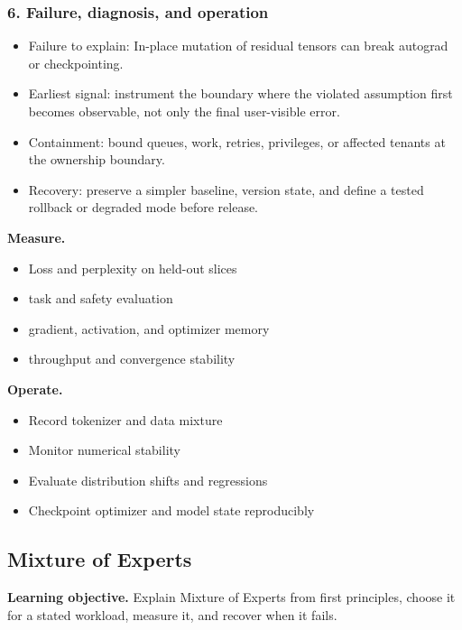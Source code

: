 \subsubsection*{6. Failure, diagnosis, and operation}
\begin{itemize}
\item Failure to explain: In-place mutation of residual tensors can break autograd or checkpointing.
\item Earliest signal: instrument the boundary where the violated assumption first becomes observable, not only the final user-visible error.
\item Containment: bound queues, work, retries, privileges, or affected tenants at the ownership boundary.
\item Recovery: preserve a simpler baseline, version state, and define a tested rollback or degraded mode before release.
\end{itemize}
\textbf{Measure.}\begin{itemize}
\item Loss and perplexity on held-out slices
\item task and safety evaluation
\item gradient, activation, and optimizer memory
\item throughput and convergence stability
\end{itemize}
\textbf{Operate.}\begin{itemize}
\item Record tokenizer and data mixture
\item Monitor numerical stability
\item Evaluate distribution shifts and regressions
\item Checkpoint optimizer and model state reproducibly
\end{itemize}
\subsection{Mixture of Experts}
\textbf{Learning objective.} Explain Mixture of Experts from first principles, choose it for a stated workload, measure it, and recover when it fails.
